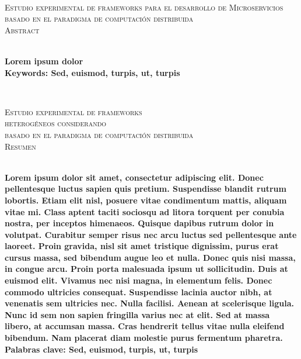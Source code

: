 
{
    \thispagestyle{empty}
    ~\\[0.2cm]
    \begin{center}
        \textsc{\huge Estudio experimental de frameworks para el desarrollo de Microservicios } \\[0.2cm] 
        \textsc{\huge basado en el paradigma de computación distribuida} \\[1cm]
        \textsc{\Large Abstract}
    \end{center}
    ~\\[0.2cm]
    \textbf{\large 
    Lorem ipsum dolor
}
	~\\[1.0cm]
    \textbf{\large Keywords: Sed, euismod, turpis, ut, turpis}
}
\clearpage
{
    ~\\[0.2cm]
    \begin{center}
        \textsc{\huge Estudio experimental de frameworks } \\[0.2cm]
        \textsc{\huge heterog\'eneos considerando} \\[0.2cm]
        \textsc{\huge basado en el paradigma de computación distribuida} \\[1.0cm]
        \textsc{\Large Resumen}
    \end{center}
    ~\\[0.2cm]
    \textbf{\large Lorem ipsum dolor sit amet, consectetur adipiscing elit. Donec pellentesque luctus sapien quis pretium. Suspendisse blandit rutrum lobortis. Etiam elit nisl, posuere vitae condimentum mattis, aliquam vitae mi. Class aptent taciti sociosqu ad litora torquent per conubia nostra, per inceptos himenaeos. Quisque dapibus rutrum dolor in volutpat. Curabitur semper risus nec arcu luctus sed pellentesque ante laoreet. Proin gravida, nisl sit amet tristique dignissim, purus erat cursus massa, sed bibendum augue leo et nulla.
Donec quis nisi massa, in congue arcu. Proin porta malesuada ipsum ut sollicitudin. Duis at euismod elit. Vivamus nec nisi magna, in elementum felis. Donec commodo ultricies consequat. Suspendisse lacinia auctor nibh, at venenatis sem ultricies nec. Nulla facilisi. Aenean at scelerisque ligula. Nunc id sem non sapien fringilla varius nec at elit. Sed at massa libero, at accumsan massa. Cras hendrerit tellus vitae nulla eleifend bibendum. Nam placerat diam molestie purus fermentum pharetra.}
	~\\[1.0cm]
    \textbf{\large Palabras clave: Sed, euismod, turpis, ut, turpis}	
}
\cleardoublepage
